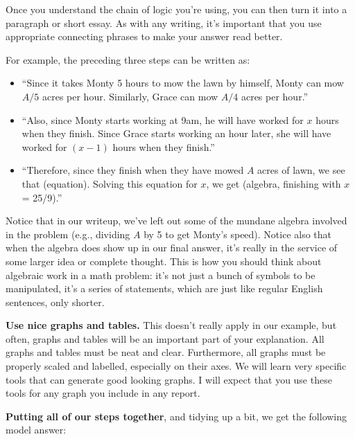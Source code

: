 \documentclass{article}
\begin{document}
Once you understand the chain of logic you're using, you can then turn it into a paragraph or short essay. As with any writing, it's important that you use appropriate connecting phrases to make your answer read better.

For example, the preceding three steps can be written as:

\begin{itemize}

\item ``Since it takes Monty 5 hours to mow the lawn by himself, Monty can mow $A/5$ acres per hour. Similarly, Grace can mow $A/4$ acres per hour.''

\item ``Also, since Monty starts working at 9am, he will have worked for $x$ hours when they finish. Since Grace starts working an hour later, she will have worked for $(x−1)$ hours when they finish.''

\item ``Therefore, since they finish when they have mowed $A$ acres of lawn, we see that (equation). Solving this equation for $x$, we get (algebra, finishing with $x$ = 25/9).''

\end{itemize}

Notice that in our writeup, we've left out some of the mundane algebra involved in the problem (e.g., dividing $A$ by 5 to get Monty's speed). Notice also that when the algebra does show up in our final answer, it's really in the service of some larger idea or complete thought. This is how you should think about algebraic work in a math problem: it's not just a bunch of symbols to be manipulated, it's a series of statements, which are just like regular English sentences, only shorter.

\textbf{Use nice graphs and tables.} This doesn't really apply in our example, but often, graphs and tables will be an important part of your explanation. All graphs and tables must be neat and clear. Furthermore, all graphs must be properly scaled and labelled, especially on their axes. We will learn very specific tools that can generate good looking graphs. I will expect that you use these tools for any graph you include in any report.

\textbf{Putting all of our steps together}, and tidying up a bit, we get the following model answer:
\end{document}
